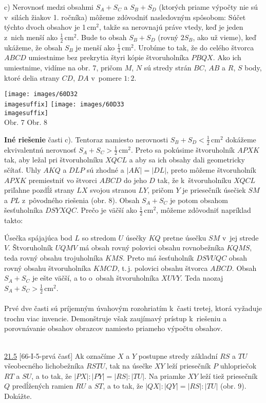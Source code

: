c) Nerovnosť medzi obsahmi $S_A + S_C$ a $S_B + S_D$ (ktorých priame výpočty nie sú v~silách žiakov 1. ročníka) môžeme zdôvodniť nasledovným spôsobom: Súčet týchto dvoch obsahov je 1\,cm$^2$, takže sa nerovnajú práve vtedy, keď je jeden z~nich menší ako $\frac{1}{2}$\,cm$^2$. Bude to obsah $S_B +S_D$ (rovný $2S_B$, ako už vieme), keď ukážeme, že obsah $S_B$ je menší ako $\frac{1}{4}$\,cm$^2$. Urobíme to tak, že do celého štvorca $ABCD$ umiestnime bez prekrytia štyri kópie štvoruholníka $PBQX$. Ako ich umiestnime, vidíme na obr. 7, pričom $M$, $N$ sú stredy strán $BC$, $AB$ a $R$, $S$ body, ktoré delia strany $CD$, $DA$ v~pomere $1 : 2$.
\begin{center}
\texttt{[image: images/60D32\\imagesuffix]} \texttt{[image: images/60D33\\imagesuffix]}\\

Obr. 7 \hspace{140pt} Obr. 8
\end{center}
\textbf{Iné riešenie} časti c). Tentoraz namiesto nerovnosti $S_B + S_ D < \frac{1}{2}$\,cm$^2$ dokážeme ekvivalentnú nerovnosť $S_A +S_C >\frac{1}{2}$\,cm$^2$. Preto sa pokúsime  štvoruholník $APXK$ tak, aby ležal pri štvoruholníku $XQCL$ a aby sa ich obsahy dali geometricky sčítať. Uhly $AKQ$ a $DLP$ sú zhodné a $| AK | = | DL |$, preto môžeme štvoruholník $APXK$ premiestniť vo štvorci $ABCD$ do jeho  $D$ tak, že k~štvoruholníku $XQCL$ priľahne pozdĺž strany $LX$ svojou stranou $LY$, pričom $Y$ je priesečník úsečiek $SM$ a $PL$ z~pôvodného riešenia (obr. 8). Obsah $S_A + S_C$ je potom obsahom šesťuholníka $DSYXQC$. Prečo je väčší ako $\frac{1}{2}$\,cm$^2$, môžeme zdôvodniť napríklad takto:

Úsečka spájajúca bod $L$ so stredom $U$ úsečky $KQ$ pretne úsečku $SM$ v~jej strede $V$. Štvoruholník $UQMV$ má obsah rovný polovici obsahu rovnobežníka $KQMS$, teda rovný obsahu trojuholníka $KMS$. Preto má šesťuholník $DSV UQC$ obsah rovný obsahu štvoruholníka $KMCD$,  t.\,j. polovici obsahu štvorca $ABCD$. Obsah $S_A +S_C$ je ešte väčší, a to o~obsah štvoruholníka $XUVY$. Teda naozaj $S_A + S_C >\frac{1}{2}$\,cm$^2$.\\
\\
\kom Prvé dve časti sú príjemným úvahovým rozohriatím k~časti tretej, ktorá vyžaduje trochu viac invencie. Demonštruje však zaujímavý prístup k~riešeniu a porovnávanie obsahov obrazcov namiesto priameho výpočtu obsahov.\\
\\
\begin{tcolorbox}[breakable,notitle,boxrule=0pt,colback=light-gray,colframe=light-gray]\ul{21.5} [66-I-5-prvá časť] Ak označíme $X$ a $Y$ postupne stredy základní $RS$ a $TU$ všeobecného lichobežníka $RSTU$, tak na úsečke $XY$ leží priesečník $P$ uhlopriečok $RT$ a $SU$, a to tak, že $|PX| : |PY | = |RS| : |TU|$. Na priamke $XY$ leží tiež priesečník $Q$ predĺžených ramien $RU$ a $ST$, a to tak, že $|QX| : |QY | = |RS| : |TU|$ (obr. 9). Dokážte.

\end{tcolorbox}

